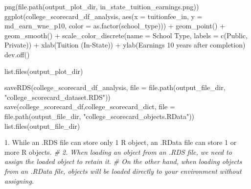 \documentclass[
]{article}
\newenvironment{Shaded}{\begin{snugshade}}{\end{snugshade}}
\newcommand{\AttributeTok}[1]{\textcolor[rgb]{0.77,0.63,0.00}{#1}}
\newcommand{\CommentTok}[1]{\textcolor[rgb]{0.56,0.35,0.01}{\textit{#1}}}
\newcommand{\DecValTok}[1]{\textcolor[rgb]{0.00,0.00,0.81}{#1}}
\newcommand{\FloatTok}[1]{\textcolor[rgb]{0.00,0.00,0.81}{#1}}
\newcommand{\FunctionTok}[1]{\textcolor[rgb]{0.00,0.00,0.00}{#1}}
\newcommand{\NormalTok}[1]{#1}
\newcommand{\SpecialCharTok}[1]{\textcolor[rgb]{0.00,0.00,0.00}{#1}}
\newcommand{\StringTok}[1]{\textcolor[rgb]{0.31,0.60,0.02}{#1}}
\begin{document}
\begin{Shaded}
\begin{Highlighting}[]
\FunctionTok{png}\NormalTok{(}\FunctionTok{file.path}\NormalTok{(output\_plot\_dir, }\StringTok{\textquotesingle{}in\_state\_tuition\_earnings.png\textquotesingle{}}\NormalTok{))}
\FunctionTok{ggplot}\NormalTok{(college\_scorecard\_df\_analysis, }\FunctionTok{aes}\NormalTok{(}\AttributeTok{x =}\NormalTok{ tuitionfee\_in, }\AttributeTok{y =}\NormalTok{ md\_earn\_wne\_p10, }\AttributeTok{color =} \FunctionTok{as.factor}\NormalTok{(school\_type))) }\SpecialCharTok{+}
  \FunctionTok{geom\_point}\NormalTok{() }\SpecialCharTok{+}
  \FunctionTok{geom\_smooth}\NormalTok{() }\SpecialCharTok{+}
  \FunctionTok{scale\_color\_discrete}\NormalTok{(}\AttributeTok{name =} \StringTok{\textquotesingle{}School Type\textquotesingle{}}\NormalTok{, }\AttributeTok{labels =} \FunctionTok{c}\NormalTok{(}\StringTok{\textquotesingle{}Public\textquotesingle{}}\NormalTok{, }\StringTok{\textquotesingle{}Private\textquotesingle{}}\NormalTok{)) }\SpecialCharTok{+}
  \FunctionTok{xlab}\NormalTok{(}\StringTok{\textquotesingle{}Tuition (In{-}State)\textquotesingle{}}\NormalTok{) }\SpecialCharTok{+} \FunctionTok{ylab}\NormalTok{(}\StringTok{\textquotesingle{}Earnings 10 years after completion\textquotesingle{}}\NormalTok{)}
\FunctionTok{dev.off}\NormalTok{()}

\FunctionTok{list.files}\NormalTok{(output\_plot\_dir)}


\FunctionTok{saveRDS}\NormalTok{(college\_scorecard\_df\_analysis, }\AttributeTok{file =} \FunctionTok{file.path}\NormalTok{(output\_file\_dir, }\StringTok{"college\_scorecard\_dataset.RDS"}\NormalTok{))}
\FunctionTok{save}\NormalTok{(college\_scorecard\_df,college\_scorecard\_dict, }\AttributeTok{file =} \FunctionTok{file.path}\NormalTok{(output\_file\_dir, }\StringTok{"college\_scorecard\_objects.RData"}\NormalTok{))}
\FunctionTok{list.files}\NormalTok{(output\_file\_dir)}

\FloatTok{1.}\NormalTok{ While an .RDS file can store only }\DecValTok{1}\NormalTok{ R object, an .RData file can store }\DecValTok{1}\NormalTok{ or more R objects.}
\CommentTok{\# 2. When loading an object from an .RDS file, we need to assign the loaded object to retain it. }
\CommentTok{\#    On the other hand, when loading objects from an .RData file, objects will be loaded directly to your environment without assigning.}


\end{Highlighting}
\end{Shaded}
\end{document}
